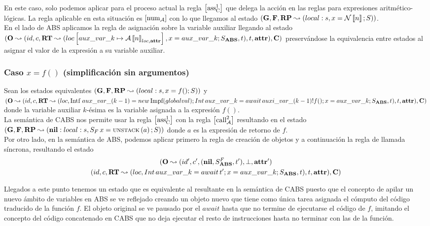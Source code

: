 En este caso, solo podemos aplicar para el proceso actual la regla $\left[ \text{ass}_{\text{C}}^{1} \right]$ que delega la acción en las reglas para expresiones aritmético-lógicas. La regla aplicable en esta situación es $\left[ \text{num}_{\mathcal{A}} \right]$ con lo que llegamos al estado $(\mathbf{G}, \mathbf{F}, \textbf{RP} \leadsto (local:s,x = \mathcal{N}\left\llbracket n \right\rrbracket\mbox{;\,}S))$.\\

En el lado de ABS aplicamos la regla de asignación sobre la variable auxiliar llegando al estado $(\mathbf{O} \leadsto (id, c, \textbf{RT} \leadsto (loc \left[ aux\_var\_k\mapsto\mathcal{A} \left\llbracket n \right\rrbracket_{loc, \textbf{attr}} \right], x = aux\_var\_k\mbox{;\,}S_{\textbf{ABS}}, t), t, \textbf{attr}), \mathbf{C})$ preservándose la equivalencia entre estados al asignar el valor de la expresión a su variable auxiliar.

\subsubsection{Caso $x = f()$ (simplificación sin argumentos)}
Sean los estados equivalentes $(\mathbf{G}, \mathbf{F}, \textbf{RP} \leadsto (local:s,x = f()\mbox{;\,}S))$ y $(\mathbf{O} \leadsto (id, c, \textbf{RT} \leadsto (loc, \mbox{Intf }  aux\_var\_(k-1) = new\, \mbox{Impf}(globalval) \mbox{;\,} Int\, aux\_var\_k = await\,auxi\_var\_(k-1)!f()\mbox{;\,} x = aux\_var\_k\mbox{;\,} S_{\textbf{ABS}}, t), t, \textbf{attr}), \mathbf{C})$ donde la variable auxiliar $k$-ésima es la variable asignada a la expresión $f()$.\\

La semántica de CABS nos permite usar la regla $\left[ \text{ass}_{\text{C}}^{1} \right]$ con la regla $\left[ \text{call}_{\mathcal{A}}^2 \right]$ resultando en el estado $(\mathbf{G}, \mathbf{F}, \textbf{RP} \leadsto (\textbf{nil}:local:s, S_F\,x = \text{\scriptsize{UNSTACK}}\left(a\right)\mbox{;\,}S))$ donde $a$ es la expresión de retorno de $f$.\\

Por otro lado, en la semántica de ABS, podemos aplicar primero la regla de creación de objetos y a continuación la regla de llamada síncrona, resultando el estado
\begin{multline*}
  (\mathbf{O} \leadsto (id', c', (\textbf{nil}, S_{\textbf{ABS}}^F, t'), \perp, \textbf{attr}')\\
  (id, c, \textbf{RT} \leadsto (loc, Int\, aux\_var\_k = await\,t'\mbox{;\,} x = aux\_var\_k\mbox{;\,} S_{\textbf{ABS}}, t), t, \textbf{attr}), \mathbf{C})
\end{multline*}

Llegados a este punto tenemos un estado que es equivalente al resultante en la semántica de CABS puesto que el concepto de apilar un nuevo ámbito de variables en ABS se ve reflejado creando un objeto nuevo que tiene como única tarea asignada el cómputo del código traducido de la función $f$. El objeto original se ve pausado por el $await$ hasta que no termine de ejecutarse el código de $f$, imitando el concepto del código concatenado en CABS que no deja ejecutar el resto de instrucciones hasta no terminar con las de la función.\\

